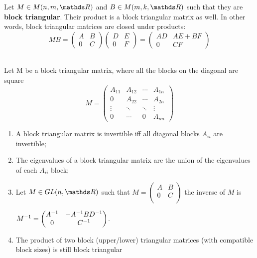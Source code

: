 \documentclass[computationalMathematics.tex]{subfiles}
\begin{document}
\begin{proposition}
  Let $M \in M(n, m, \R)$ and $B \in M(m, k, \R)$ such that they are \textbf{block triangular}.
  Their product is a block triangular matrix as well. In other words, block triangular matrices are closed under products:
  \[
  M B 
  = \begin{pmatrix}
    A & B\\
    0 & C
  \end{pmatrix}
  \begin{pmatrix}
    D & E\\
    0 & F
  \end{pmatrix}
  = 
  \begin{pmatrix}
    AD & AE + BF\\
    0 & CF
  \end{pmatrix}
\]
\end{proposition}

\begin{proposition}~\\
    Let M be a block triangular matrix, where all the blocks on the diagonal are square
   \[
     M 
      = \begin{pmatrix}
        A_{11}  & A_{12} & \cdots & A_{1n}\\
        0       & A_{22} & \cdots & A_{2n}\\
        \vdots  &\ddots & \ddots & \vdots\\
        0       & \cdots & 0 & A_{nn}
      \end{pmatrix}
    \]
    \begin{enumerate}
      \item A block triangular matrix is invertible iff all diagonal blocks $A_{ii}$ are invertible;
      \item The eigenvalues of a block triangular matrix are the union of the eigenvalues of each $A_{ii}$ block;
      \item Let $M \in GL(n, \R)$ such that $M= 
        \begin{pmatrix}
          A & B\\
          0 & C\\
        \end{pmatrix}$ 
       the inverse of $M$ is 
        
        ${M}^{-1} = 
        \begin{pmatrix}
          {A}^{-1} & -{A}^{-1}B{D}^{-1}\\
          0 & {C}^{-1}
        \end{pmatrix}$.
      \item The product of two block (upper/lower) triangular matrices
(with compatible block sizes) is still block triangular
    \end{enumerate}
  \end{proposition}
\end{document}
